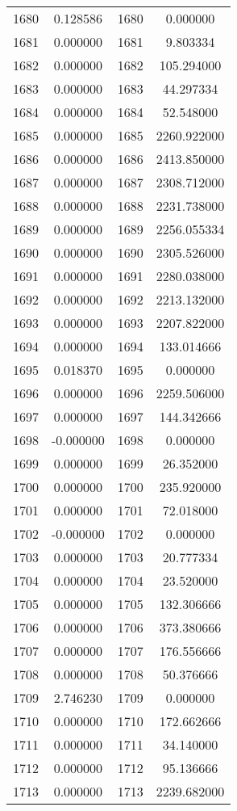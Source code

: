 \documentclass[12pt]{article}
\begin{document}
\begin{longtable}{@{}cccc@{}}
1680 & 0.128586 & 1680 & 0.000000 \\
1681 & 0.000000 & 1681 & 9.803334 \\
1682 & 0.000000 & 1682 & 105.294000 \\
1683 & 0.000000 & 1683 & 44.297334 \\
1684 & 0.000000 & 1684 & 52.548000 \\
1685 & 0.000000 & 1685 & 2260.922000 \\
1686 & 0.000000 & 1686 & 2413.850000 \\
1687 & 0.000000 & 1687 & 2308.712000 \\
1688 & 0.000000 & 1688 & 2231.738000 \\
1689 & 0.000000 & 1689 & 2256.055334 \\
1690 & 0.000000 & 1690 & 2305.526000 \\
1691 & 0.000000 & 1691 & 2280.038000 \\
1692 & 0.000000 & 1692 & 2213.132000 \\
1693 & 0.000000 & 1693 & 2207.822000 \\
1694 & 0.000000 & 1694 & 133.014666 \\
1695 & 0.018370 & 1695 & 0.000000 \\
1696 & 0.000000 & 1696 & 2259.506000 \\
1697 & 0.000000 & 1697 & 144.342666 \\
1698 & -0.000000 & 1698 & 0.000000 \\
1699 & 0.000000 & 1699 & 26.352000 \\
1700 & 0.000000 & 1700 & 235.920000 \\
1701 & 0.000000 & 1701 & 72.018000 \\
1702 & -0.000000 & 1702 & 0.000000 \\
1703 & 0.000000 & 1703 & 20.777334 \\
1704 & 0.000000 & 1704 & 23.520000 \\
1705 & 0.000000 & 1705 & 132.306666 \\
1706 & 0.000000 & 1706 & 373.380666 \\
1707 & 0.000000 & 1707 & 176.556666 \\
1708 & 0.000000 & 1708 & 50.376666 \\
1709 & 2.746230 & 1709 & 0.000000 \\
1710 & 0.000000 & 1710 & 172.662666 \\
1711 & 0.000000 & 1711 & 34.140000 \\
1712 & 0.000000 & 1712 & 95.136666 \\
1713 & 0.000000 & 1713 & 2239.682000 \\

\end{longtable}
\end{document}
